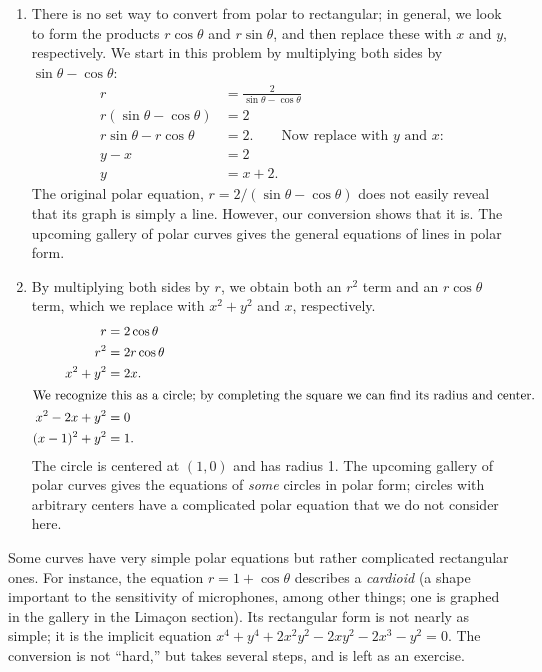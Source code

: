 \begin{example}
\begin{enumerate}
	We can rewrite the original rectangular equation $xy=1$ as $y=1/x$. This is graphed in \autoref{fig:polar6}; note how it only exists in the first and third quadrants.
		
	\item		There is no set way to convert from polar to rectangular; in general, we look to form the products $r\cos \theta$ and $r\sin\theta$, and then replace these with $x$ and $y$, respectively. We start in this problem by multiplying both sides by $\sin\theta-\cos\theta$:
	\begin{align*}
	r &= \frac{2}{\sin\theta-\cos\theta} \\
	r(\sin\theta-\cos\theta) &= 2\\
	r\sin\theta-r\cos\theta &= 2. \qquad \text{Now replace with $y$ and $x$:}\\
	y-x &= 2\\
	y &= x+2.
	\end{align*}
	The original polar equation, $r=2/(\sin\theta-\cos\theta)$ does not easily reveal that its graph is simply a line. However, our conversion shows that it is. The upcoming gallery of polar curves gives the general equations of lines in polar form.

	\item		By multiplying both sides by $r$, we obtain both an $r^2$ term and an $r\cos\theta$ term, which we replace with $x^2+y^2$ and $x$, respectively. 
	\begin{align*}
	r &=2\cos\theta \\
	r^2 &= 2r\cos\theta \\
	x^2+y^2 &= 2x. \\
	\intertext{We recognize this as a circle; by completing the square we can find its radius and center.}
	x^2-2x+y^2 &= 0 \\
	(x-1)^2 + y^2 &=1.
	\end{align*}
	The circle is centered at $(1,0)$ and has radius 1. The upcoming gallery of polar curves gives the equations of \emph{some} circles in polar form; circles with arbitrary centers have a complicated polar equation that we do not consider here.
\end{enumerate}
\end{example}

Some curves have very simple polar equations but rather complicated rectangular ones. For instance, the equation $r=1+\cos\theta$ describes a \emph{cardioid} (a shape important to the sensitivity of microphones, among other things; one is graphed in the gallery in the Limaçon section). Its rectangular form is not nearly as simple; it is the implicit equation
$x^4+y^4+2x^2y^2-2xy^2-2x^3-y^2=0$. The conversion is not ``hard,'' but takes several steps, and is left as an exercise.

